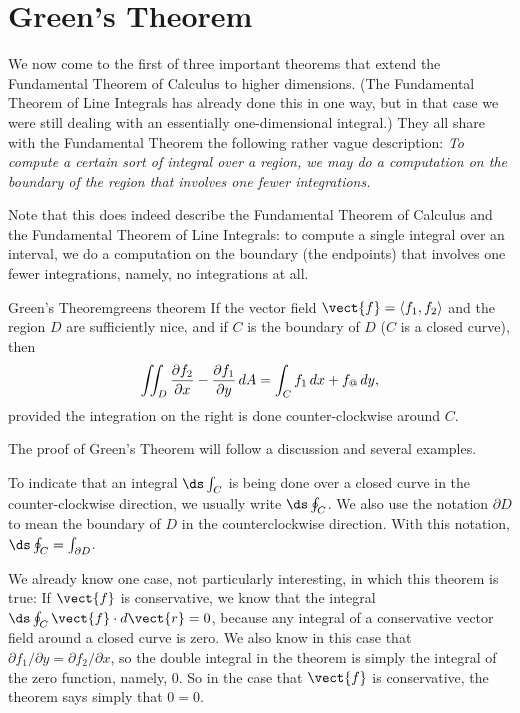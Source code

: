 \section{Green's Theorem}\label{sec:GreensTheorem}

We now come to the first of three important theorems that extend the
Fundamental Theorem of Calculus to higher dimensions. (The Fundamental
Theorem of Line Integrals has already done this in one way, but in
that case we were still dealing with an essentially one-dimensional
integral.) They all share with the Fundamental Theorem the following
rather vague description: \emph{To compute a certain sort of integral over a
region, we may do a computation on the boundary of the region
that involves one fewer integrations.}

Note that this does indeed describe the Fundamental Theorem of
Calculus and the Fundamental Theorem of Line Integrals: to
compute a single integral over an interval, we do a computation on the
boundary (the endpoints) that involves one fewer integrations, namely,
no integrations at all.

\begin{theorem}{Green's Theorem}{greens theorem}
If the vector field $\vect{f}=\langle
f_1,f_2\rangle$ and the region $D$ are sufficiently nice, and if $C$ is
the boundary of $D$ ($C$ is a closed curve), then
$$\iint_D {\partial f_2\over\partial x}
-{\partial f_1\over\partial y} \,dA = \int_C f_1\,dx +f_@\,dy ,$$
provided the integration on the right is done counter-clockwise around
$C$.
\end{theorem}

The proof of Green's Theorem will follow a discussion and several examples.

To indicate that an integral $\ds\int_C$ is being done over a closed
curve in the counter-clockwise direction, we usually write
$\ds\oint_C$. We also use the notation $\partial D$ to mean the
boundary of $D$  in the
counterclockwise direction. With this notation,
$\ds\oint_C=\int_{\partial D}$.

We already know one case, not particularly interesting, in which this
theorem is true: If $\vect{f}$ is conservative, we know that the integral
$\ds\oint_C \vect{f}\cdot d\vect{r}=0$, because any integral of a
conservative vector field around a closed curve is zero. We also know
in this case that $\partial f_1 /\partial y=\partial f_2 /\partial x$, so
the double integral  in the theorem is simply the integral of the zero
function, namely, 0. So in the case that $\vect{f}$ is conservative, the
theorem says simply that $0=0$. 


